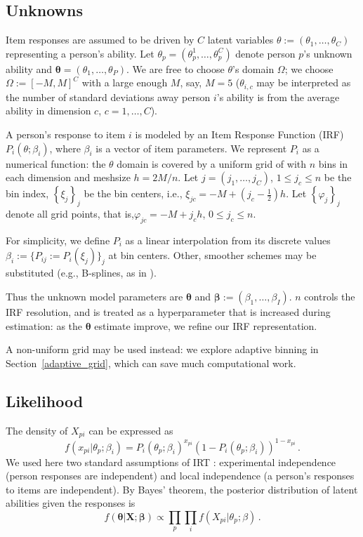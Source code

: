 \documentclass{article}
\newcommand{\bbeta}{\boldsymbol\beta}
\newcommand{\bta}{\boldsymbol\ta}
\newcommand{\ta}{\theta}
\newcommand{\bX}{\mathbf{X}}
\begin{document}
\subsection{Unknowns}
Item responses are assumed to be driven by $C$ latent variables $\ta := (\ta_1,\dots,\ta_C)$ representing a person's ability. Let $\ta_p=(\ta_p^1,\dots,\ta_p^C)$ denote person $p$'s unknown ability and $\bta = (\ta_1,\dots,\ta_P)$. We are free to choose $\ta$'s domain $\Omega$; we choose $\Omega := [-M,M]^C$ with a large enough $M$, say, $M = 5$ ($\ta_{i,c}$ may be interpreted as the number of standard deviations away person $i$'s ability is from the average ability in dimension $c$, $c=1,\dots,C$).

A person's response to item $i$ is modeled by an Item Response Function (IRF) $P_i(\ta;\beta_i)$, where $\beta_i$ is a vector of item parameters. We represent $P_i$ as a numerical function: the $\ta$ domain is covered by a uniform grid of with $n$ bins in each dimension and meshsize $h = 2 M / n$. Let $j=(j_1,\dots,j_C)$, $1 \leq j_c \leq n$ be the bin index, $\left\{\xi_j \right\}_j$ be the bin centers, i.e., $\xi_{jc} = -M + (j_c - \frac12) h$. Let $\left\{\varphi_j\right\}_j$ denote all grid points, that is,$\varphi_{jc} = -M + j_c h$, $0 \leq j_c \leq n$.

For simplicity, we define $P_i$ as a linear interpolation from its discrete values $\beta_i := \{P_{ij} := P_i(\xi_j)\}_j$ at bin centers. Other, smoother schemes may be substituted (e.g., B-splines, as in \cite{matt_bsplines}).

Thus the unknown model parameters are $\bta$ and $\bbeta := (\beta_1,\dots,\beta_I)$. $n$ controls the IRF resolution, and is treated as a hyperparameter that is increased during estimation: as the $\bta$ estimate improve, we refine our IRF representation.

A non-uniform grid may be used instead: we explore adaptive binning in Section~\ref{adaptive_grid}, which can save much computational work. 

\subsection{Likelihood}
The density of $X_{pi}$ can be expressed as 
\begin{equation}
  f(x_{pi}|\ta_p;\beta_i) = P_i(\ta_p;\beta_i)^{x_{pi}} \left(1 - P_i(\ta_p;\beta_i)\right)^{1-x_{pi}}\,.
\end{equation}
We used here two standard assumptions of IRT \cite{junker}: experimental independence (person responses are independent) and local independence (a person's responses to items are independent). By Bayes' theorem, the posterior distribution of latent abilities given the responses is
\begin{equation}
  f(\bta|\bX;\bbeta) \propto\prod_p \prod_i f(X_{pi}|\ta_p;\beta)\,.
  \label{like}
\end{equation}
\end{document}
